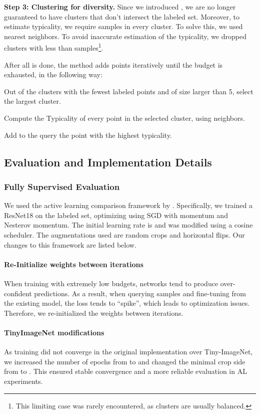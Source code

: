 \documentclass{article}
\newcommand{\myparagraph}[1]{\smallskip\noindent\textbf{#1}}
\begin{document}
\myparagraph{Step 3: Clustering for diversity.}
Since we introduced , we are no longer guaranteed to have  clusters that don't intersect the labeled set.
Moreover, to estimate typicality, we require  samples in every cluster. To solve this, we used  nearest neighbors. To avoid inaccurate estimation of the typicality, we dropped clusters with less than  samples\footnote{This limiting case was rarely encountered, as clusters are usually balanced.}.

After all is done, the method adds points iteratively until the budget is exhausted, in the following way: 
\begin{inparaenum}[(1)]
    \item Out of the clusters with the fewest labeled points and of size larger than 5, select the largest cluster.
    \item Compute the Typicality of every point in the selected cluster, using  neighbors.
    \item Add to the query the point with the highest typicality.
\end{inparaenum}


\subsection{Evaluation and Implementation Details}
\label{app:eval_impl_details}

\subsubsection{Fully Supervised Evaluation}
We used the active learning comparison framework by \citet{Munjal2020TowardsRA}. 
Specifically, we trained a ResNet18 on the labeled set, optimizing using SGD with  momentum and Nesterov momentum. The initial learning rate is  and was modified using a cosine scheduler. The augmentations used are random crops and horizontal flips. Our changes to this framework are listed below.
\paragraph{Re-Initialize weights between iterations}
When training with extremely low budgets, networks tend to produce over-confident predictions. As a result, when querying samples and fine-tuning from the existing model, the loss tends to ``spike'', which leads to optimization issues. Therefore, we re-initialized the weights between iterations.

\paragraph{TinyImageNet modifications}
As training did not converge in the original implementation over Tiny-ImageNet, we increased the number of epochs from  to  and changed the minimal crop side from  to . This ensured stable  convergence and a more reliable evaluation in AL experiments.
\end{document}
